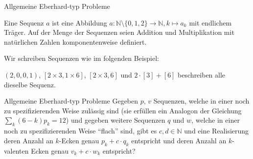 \documentclass[10pt, notheorems]{beamer}
\newcommand{\set}[1]{\{ #1 \}}
\newcommand{\nats}{\mathbb{N}}
\newcommand{\hdef}[1]{\textcolor{darkred2}{#1}}
\begin{document}
\begin{frame}{Allgemeine {\sc Eberhard}-typ Probleme}
  \begin{definition}[Sequenz]
    Eine \hdef{Sequenz} $a$ ist eine Abbildung $a : \nats \setminus \set{0, 1, 2} \to \nats, k \mapsto a_k$ mit endlichem Träger. Auf der Menge der Sequenzen seien Addition und Multiplikation mit natürlichen Zahlen komponentenweise definiert.
  \end{definition}
  \pause
  Wir schreiben Sequenzen wie im folgenden Beispiel:
  \begin{example}
    $(2, 0, 0, 1)$, $[2 \times 3, 1 \times 6]$, $[2 \times 3, 6]$ und $2 \cdot [3] + [6]$ beschreiben alle dieselbe Sequenz.
  \end{example}
  \pause
  \begin{block}{Allgemeine {\sc Eberhard}-typ Probleme}
    Gegeben $p$, $v$ Sequenzen, welche in einer noch zu spezifizierenden Weise zulässig sind (sie erfüllen ein Analogon der Gleichung $\sum_k (6 - k) p_k = 12$) und gegeben weitere Sequenzen $q$ und $w$, welche in einer noch zu spezifizierenden Weise ``flach'' sind, gibt es $c, d \in \nats$ und eine Realisierung deren Anzahl an $k$-Ecken genau $p_k + c \cdot q_k$ entspricht und deren Anzahl an $k$-valenten Ecken genau $v_k + c \cdot w_k$ entspricht?
  \end{block}
\end{frame}
\end{document}
